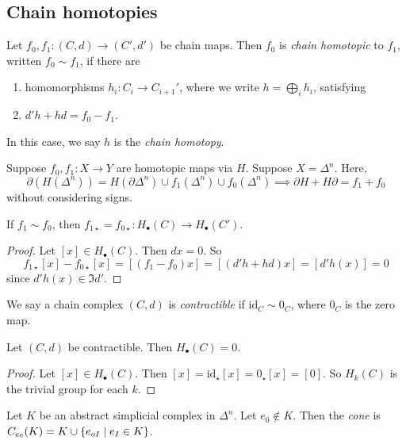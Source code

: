\subsection{Chain homotopies}
\begin{definition}
	Let \( f_0, f_1 \colon (C, d) \to (C', d') \) be chain maps.
	Then \( f_0 \) is \emph{chain homotopic} to \( f_1 \), written \( f_0 \sim f_1 \), if there are
	\begin{enumerate}
		\item homomorphisms \( h_i \colon C_i \to C_{i+1}' \), where we write \( h = \bigoplus_i h_i \), satisfying
		\item \( d'h + hd = f_0 - f_1 \).
	\end{enumerate}
	In this case, we say \( h \) is the \emph{chain homotopy}.
\end{definition}
\begin{example}
	Suppose \( f_0, f_1 \colon X \to Y \) are homotopic maps via \( H \).
	Suppose \( X = \Delta^n \).
	Here,
	\[ \partial(H(\Delta^n)) = H(\partial\Delta^n) \cup f_1(\Delta^n) \cup f_0(\Delta^n) \implies \partial H + H \partial = f_1 + f_0 \]
	without considering signs.
\end{example}
\begin{lemma}
	If \( f_1 \sim f_0 \), then \( f_{1\star} = f_{0\star} \colon H_\bullet(C) \to H_\bullet(C') \).
\end{lemma}
\begin{proof}
	Let \( [x] \in H_\bullet(C) \).
	Then \( dx = 0 \).
	So
	\[ f_{1\star}[x] - f_{0\star}[x] = [(f_1 - f_0)x] = [(d'h + hd)x] = [d'h(x)] = 0 \]
	since \( d'h(x) \in \Im d' \).
\end{proof}
\begin{definition}
	We say a chain complex \( (C, d) \) is \emph{contractible} if \( \mathrm{id}_C \sim 0_C \), where \( 0_C \) is the zero map.
\end{definition}
\begin{lemma}
	Let \( (C, d) \) be contractible.
	Then \( H_\bullet(C) = 0 \).
\end{lemma}
\begin{proof}
	Let \( [x] \in H_\bullet(C) \).
	Then \( [x] = \mathrm{id}_\star[x] = 0_\star[x] = [0] \).
	So \( H_k(C) \) is the trivial group for each \( k \).
\end{proof}
\begin{definition}
	Let \( K \) be an abstract simplicial complex in \( \Delta^n \).
	Let \( e_0 \not\in K \).
	Then the \emph{cone} is \( C_{e_0}(K) = K \cup \qty{e_{oI} \mid e_I \in K} \).
\end{definition}
